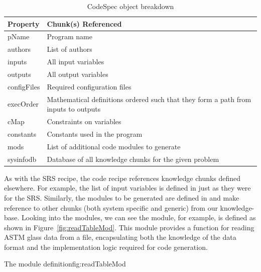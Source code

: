 \begin{table}[]
\caption{CodeSpec object breakdown}
\label{tab:codeSpecBreakdown}
\begin{tabular} {| P{.2\linewidth} | p{.8\linewidth}|}
\hline
\textbf{Property} & \textbf{Chunk(s) Referenced} 
\\ \hline 
	pName & Program name 
\\ \hline 
	authors & List of authors 
\\ \hline 
	inputs & All input variables 
\\\hline 
	outputs & All output variables 
\\\hline 
	configFiles & Required configuration files 
\\\hline 
	execOrder & Mathematical definitions ordered such that they form a path 
	from inputs to outputs 
\\\hline 
	cMap & Constraints on variables 
\\\hline 
	constants & Constants used in the program 
\\ \hline 
	mods & List of additional code modules to generate
\\ \hline 
	sysinfodb & Database of all knowledge chunks for the given problem
\\ \hline
\end{tabular}
\end{table}

As with the SRS recipe, the code recipe references knowledge chunks defined 
elsewhere. For example, the list of input variables is defined in 
 just as they were for the SRS. Similarly, the modules to be 
generated are defined in  and make reference to other 
chunks (both system specific and generic) from our knowledge-base. Looking 
into the modules, we can see the  module, for example, is 
defined as shown in Figure~\ref{fig:readTableMod}. This module provides a 
function for reading ASTM glass data from a file, encapsulating both the 
knowledge of the data format and the implementation logic required for code 
generation.

{The  module definition}{fig:readTableMod}

